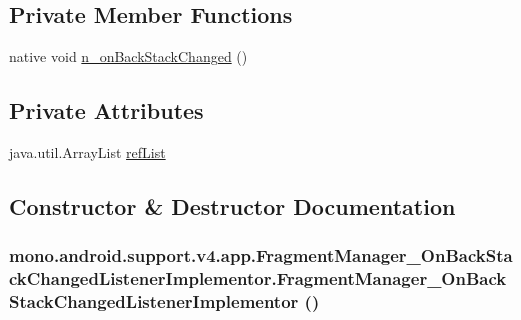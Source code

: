\subsection*{Private Member Functions}
\begin{CompactItemize}
\item 
native void \hyperlink{classmono_1_1android_1_1support_1_1v4_1_1app_1_1_fragment_manager___on_back_stack_changed_listener_implementor_3afcf8218ec9e01a0e349dd0b6d62141}{n\_\-onBackStackChanged} ()
\end{CompactItemize}
\subsection*{Private Attributes}
\begin{CompactItemize}
\item 
java.util.ArrayList \hyperlink{classmono_1_1android_1_1support_1_1v4_1_1app_1_1_fragment_manager___on_back_stack_changed_listener_implementor_5674b8c868a8fbe1ca3adfd0affdd9c1}{refList}
\end{CompactItemize}


\subsection{Constructor \& Destructor Documentation}
\hypertarget{classmono_1_1android_1_1support_1_1v4_1_1app_1_1_fragment_manager___on_back_stack_changed_listener_implementor_9688c97747d6cc39641cd3299ec3b5ec}{
\subsubsection[{FragmentManager\_\-OnBackStackChangedListenerImplementor}]{\setlength{\rightskip}{0pt plus 5cm}mono.android.support.v4.app.FragmentManager\_\-OnBackStackChangedListenerImplementor.FragmentManager\_\-OnBackStackChangedListenerImplementor ()}}
\label{classmono_1_1android_1_1support_1_1v4_1_1app_1_1_fragment_manager___on_back_stack_changed_listener_implementor_9688c97747d6cc39641cd3299ec3b5ec}




